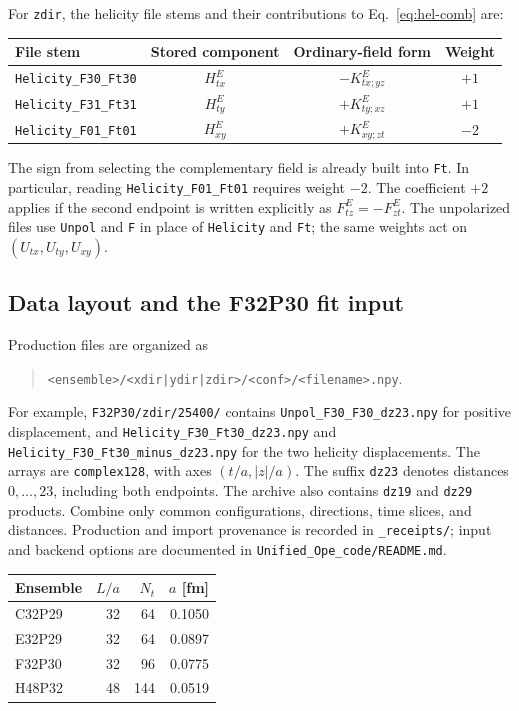 \documentclass[11pt,a4paper]{article}
\begin{document}
For \texttt{zdir}, the helicity file stems and their contributions to
Eq.~\eqref{eq:hel-comb} are:
\begin{center}
\begin{tabular}{lccc}
\toprule
File stem & Stored component & Ordinary-field form & Weight \\
\midrule
\nolinkurl{Helicity_F30_Ft30} & \(H^E_{tx}\) & \(-K^E_{tx;yz}\) & \(+1\) \\
\nolinkurl{Helicity_F31_Ft31} & \(H^E_{ty}\) & \(+K^E_{ty;xz}\) & \(+1\) \\
\nolinkurl{Helicity_F01_Ft01} & \(H^E_{xy}\) & \(+K^E_{xy;zt}\) & \(-2\) \\
\bottomrule
\end{tabular}
\end{center}
The sign from selecting the complementary field is already built into
\texttt{Ft}. In particular, reading \nolinkurl{Helicity_F01_Ft01} requires
weight \(-2\). The coefficient \(+2\) applies if the second endpoint is
written explicitly as \(F^E_{tz}=-F^E_{zt}\). The unpolarized files use
\texttt{Unpol} and \texttt{F} in place of \texttt{Helicity} and \texttt{Ft};
the same weights act on \((U_{tx},U_{ty},U_{xy})\).

\subsection{Data layout and the F32P30 fit input}
Production files are organized as
\begin{quote}
\nolinkurl{<ensemble>/<xdir|ydir|zdir>/<conf>/<filename>.npy}.
\end{quote}
For example, \nolinkurl{F32P30/zdir/25400/} contains
\nolinkurl{Unpol_F30_F30_dz23.npy} for positive displacement, and
\nolinkurl{Helicity_F30_Ft30_dz23.npy} and
\nolinkurl{Helicity_F30_Ft30_minus_dz23.npy} for the two helicity
displacements. The arrays are \texttt{complex128}, with axes
\((t/a,|z|/a)\). The suffix \texttt{dz23} denotes distances \(0,\ldots,23\),
including both endpoints. The archive also contains \texttt{dz19} and
\texttt{dz29} products. Combine only common configurations, directions,
time slices, and distances. Production and import provenance is recorded
in \nolinkurl{_receipts/}; input and backend options are documented in
\nolinkurl{Unified_Ope_code/README.md}.

\begin{center}
\begin{tabular}{lrrr}
\toprule
Ensemble & \(L/a\) & \(N_t\) & \(a\) [fm] \\
\midrule
C32P29 & 32 & 64  & 0.1050 \\
E32P29 & 32 & 64  & 0.0897 \\
F32P30 & 32 & 96  & 0.0775 \\
H48P32 & 48 & 144 & 0.0519 \\
\bottomrule
\end{tabular}
\end{center}
\end{document}
